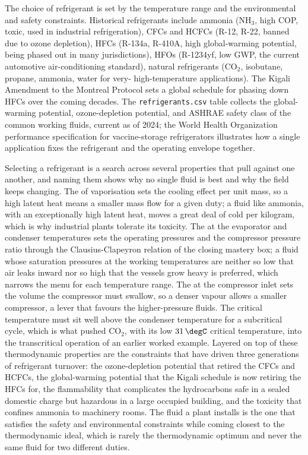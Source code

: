 The choice of refrigerant is set by the temperature range and the
environmental and safety constraints. Historical refrigerants
include ammonia (NH$_3$, high COP, toxic, used in industrial
refrigeration), CFCs and HCFCs (R-12, R-22, banned due to ozone
depletion), HFCs (R-134a, R-410A, high global-warming potential,
being phased out in many jurisdictions), HFOs (R-1234yf, low GWP,
the current automotive air-conditioning standard), natural
refrigerants (CO$_2$, isobutane, propane, ammonia, water for very-
high-temperature applications). The Kigali Amendment
\cite{law:kigali-amendment-2016} to the Montreal Protocol
\cite{law:montreal-protocol-1987} sets a global schedule for phasing
down HFCs over the coming decades. The \texttt{refrigerants.csv} table
collects the global-warming potential, ozone-depletion potential, and
ASHRAE safety class of the common working fluids, current as of 2024;
the World Health Organization performance specification for
vaccine-storage refrigerators \cite{web:who-pqs-refrigerators-2024}
illustrates how a single application fixes the refrigerant and the
operating envelope together.

Selecting a refrigerant is a search across several properties that pull against
one another, and naming them shows why no single fluid is best and why the field
keeps changing. The  of vaporisation sets the cooling effect
per unit mass, so a high latent heat means a smaller mass flow for a given duty; a
fluid like ammonia, with an exceptionally high latent heat, moves a great deal of
cold per kilogram, which is why industrial plants tolerate its toxicity. The
 at the evaporator and condenser temperatures sets
the operating pressures and the compressor pressure ratio through the
Clausius-Clapeyron relation of the closing mastery box; a fluid whose saturation
pressures at the working temperatures are neither so low that air leaks inward nor
so high that the vessels grow heavy is preferred, which narrows the menu for each
temperature range. The  at the compressor inlet sets the
volume the compressor must swallow, so a denser vapour allows a smaller
compressor, a lever that favours the higher-pressure fluids. The critical
temperature must sit well above the condenser temperature for a subcritical cycle,
which is what pushed CO$_2$, with its low $31\,\degC$ critical temperature, into
the transcritical operation of an earlier worked example. Layered on top of these
thermodynamic properties are the constraints that have driven three generations of
refrigerant turnover: the ozone-depletion potential that retired the CFCs and
HCFCs, the global-warming potential that the Kigali schedule is now retiring the
HFCs for, the flammability that complicates the hydrocarbons safe in a sealed
domestic charge but hazardous in a large occupied building, and the toxicity that
confines ammonia to machinery rooms. The fluid a plant installs is the one that
satisfies the safety and environmental constraints while coming closest to the
thermodynamic ideal, which is rarely the thermodynamic optimum and never the same
fluid for two different duties.

